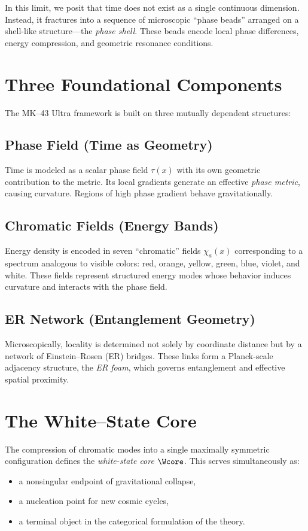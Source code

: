 In this limit, we posit that time does not exist as a single continuous dimension. 
Instead, it fractures into a sequence of microscopic ``phase beads'' arranged on a shell-like structure---the \emph{phase shell}. 
These beads encode local phase differences, energy compression, and geometric resonance conditions.

\section{Three Foundational Components}

The MK--43 Ultra framework is built on three mutually dependent structures:

\subsection{Phase Field (Time as Geometry)}
Time is modeled as a scalar phase field $\tau(x)$ with its own geometric contribution to the metric. 
Its local gradients generate an effective \emph{phase metric}, causing curvature. 
Regions of high phase gradient behave gravitationally.

\subsection{Chromatic Fields (Energy Bands)}
Energy density is encoded in seven ``chromatic'' fields $\chi_a(x)$ corresponding to a spectrum analogous to visible colors: 
red, orange, yellow, green, blue, violet, and white. 
These fields represent structured energy modes whose behavior induces curvature and interacts with the phase field.

\subsection{ER Network (Entanglement Geometry)}
Microscopically, locality is determined not solely by coordinate distance but by a network of Einstein--Rosen (ER) bridges. 
These links form a Planck-scale adjacency structure, the \emph{ER foam}, which governs entanglement and effective spatial proximity.

\section{The White--State Core}

The compression of chromatic modes into a single maximally symmetric configuration defines the \emph{white-state core} $\Wcore$. 
This serves simultaneously as:
\begin{itemize}
  \item a nonsingular endpoint of gravitational collapse,
  \item a nucleation point for new cosmic cycles,
  \item a terminal object in the categorical formulation of the theory.
\end{itemize}

